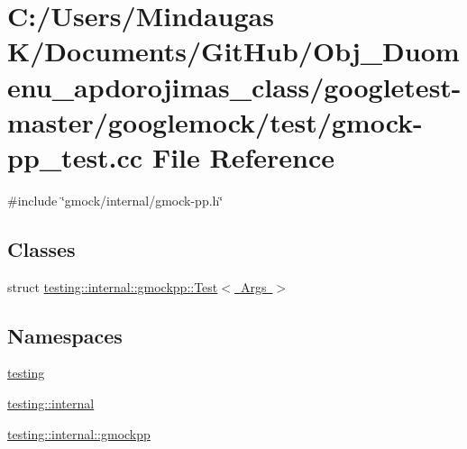 \hypertarget{googletest-master_2googlemock_2test_2gmock-pp__test_8cc}{}\section{C\+:/\+Users/\+Mindaugas K/\+Documents/\+Git\+Hub/\+Obj\+\_\+\+Duomenu\+\_\+apdorojimas\+\_\+class/googletest-\/master/googlemock/test/gmock-\/pp\+\_\+test.cc File Reference}
\label{googletest-master_2googlemock_2test_2gmock-pp__test_8cc}
{\ttfamily \#include \char`\"{}gmock/internal/gmock-\/pp.\+h\char`\"{}}\newline
\subsection*{Classes}
\begin{DoxyCompactItemize}
\item 
struct \mbox{\hyperlink{structtesting_1_1internal_1_1gmockpp_1_1_test}{testing\+::internal\+::gmockpp\+::\+Test$<$ Args $>$}}
\end{DoxyCompactItemize}
\subsection*{Namespaces}
\begin{DoxyCompactItemize}
\item 
 \mbox{\hyperlink{namespacetesting}{testing}}
\item 
 \mbox{\hyperlink{namespacetesting_1_1internal}{testing\+::internal}}
\item 
 \mbox{\hyperlink{namespacetesting_1_1internal_1_1gmockpp}{testing\+::internal\+::gmockpp}}
\end{DoxyCompactItemize}
